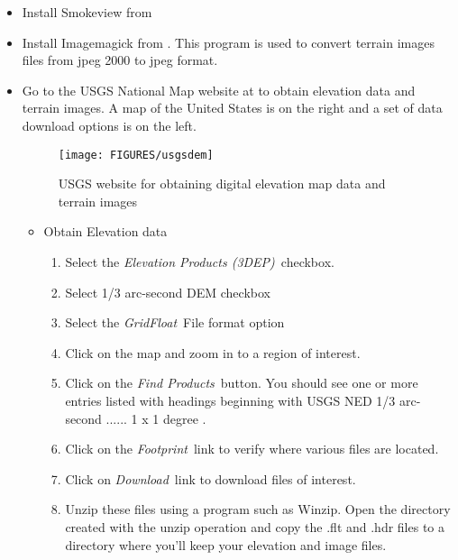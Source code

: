 

\begin{itemize}
\item Install Smokeview from 
\item Install Imagemagick from .
This program is used to convert terrain images files from jpeg 2000 to jpeg format.

\item Go to the USGS National Map website at to obtain elevation data and terrain images.
A map of the United States is on the right and a set of data download options is on the left.

\begin{figure}[bph]
\centerline{
\texttt{[image: FIGURES/usgsdem]}}
 \caption[FDS file overview]{USGS website for obtaining digital elevation map data and terrain images}
\label{usgswebsite}%
\end{figure}

\begin{itemize}
\item Obtain Elevation data

\begin{enumerate}
\item Select the {\em Elevation Products (3DEP)}\ checkbox.
\item Select 1/3 arc-second DEM checkbox
\item Select the {\em GridFloat}\ File format option
\item Click on the map and zoom in to a region of interest.
\item Click on the {\em Find Products}\ button.  You should see one or more
entries listed with headings beginning with
USGS NED 1/3 arc-second ...... 1 x 1 degree .
\item Click on the {\em Footprint}\ link to verify where various files are located.
\item Click on {\em Download}\ link to download files of interest.
\item Unzip these files using a program such as Winzip. Open the directory created with the unzip operation and
copy the .flt and .hdr files to a directory where you'll keep your elevation and image files.
\end{enumerate}


\end{itemize}
\end{itemize}
